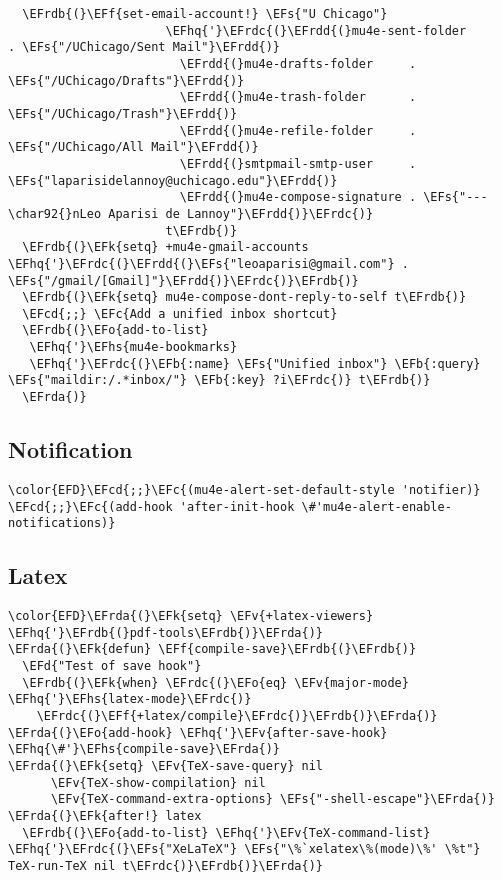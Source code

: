 \documentclass[12pt]{article}
\theoremstyle{plain}%
\theoremstyle{definition}
\theoremstyle{remark}
\newcommand{\EFc}[1]{\textcolor{EFc}{#1}} %
\newcommand{\EFcd}[1]{\textcolor{EFcd}{#1}} %
\newcommand{\EFs}[1]{\textcolor{EFs}{#1}} %
\newcommand{\EFd}[1]{\textcolor{EFd}{#1}} %
\newcommand{\EFk}[1]{\textcolor{EFk}{#1}} %
\newcommand{\EFb}[1]{\textcolor{EFb}{#1}} %
\newcommand{\EFf}[1]{\textcolor{EFf}{#1}} %
\newcommand{\EFv}[1]{\textcolor{EFv}{#1}} %
\newcommand{\EFo}[1]{\textcolor{EFo}{#1}} %
\newcommand{\EFhq}[1]{\textcolor{EFhq}{#1}} %
\newcommand{\EFhs}[1]{\textcolor{EFhs}{#1}} %
\newcommand{\EFrda}[1]{\textcolor{EFrda}{#1}} %
\newcommand{\EFrdb}[1]{\textcolor{EFrdb}{#1}} %
\newcommand{\EFrdc}[1]{\textcolor{EFrdc}{#1}} %
\newcommand{\EFrdd}[1]{\textcolor{EFrdd}{#1}} %
\begin{document}
\begin{Code}
\begin{Verbatim}
  \EFrdb{(}\EFf{set-email-account!} \EFs{"U Chicago"}
                      \EFhq{'}\EFrdc{(}\EFrdd{(}mu4e-sent-folder       . \EFs{"/UChicago/Sent Mail"}\EFrdd{)}
                        \EFrdd{(}mu4e-drafts-folder     . \EFs{"/UChicago/Drafts"}\EFrdd{)}
                        \EFrdd{(}mu4e-trash-folder      . \EFs{"/UChicago/Trash"}\EFrdd{)}
                        \EFrdd{(}mu4e-refile-folder     . \EFs{"/UChicago/All Mail"}\EFrdd{)}
                        \EFrdd{(}smtpmail-smtp-user     . \EFs{"laparisidelannoy@uchicago.edu"}\EFrdd{)}
                        \EFrdd{(}mu4e-compose-signature . \EFs{"---\char92{}nLeo Aparisi de Lannoy"}\EFrdd{)}\EFrdc{)}
                      t\EFrdb{)}
  \EFrdb{(}\EFk{setq} +mu4e-gmail-accounts \EFhq{'}\EFrdc{(}\EFrdd{(}\EFs{"leoaparisi@gmail.com"} . \EFs{"/gmail/[Gmail]"}\EFrdd{)}\EFrdc{)}\EFrdb{)}
  \EFrdb{(}\EFk{setq} mu4e-compose-dont-reply-to-self t\EFrdb{)}
  \EFcd{;;} \EFc{Add a unified inbox shortcut}
  \EFrdb{(}\EFo{add-to-list}
   \EFhq{'}\EFhs{mu4e-bookmarks}
   \EFhq{'}\EFrdc{(}\EFb{:name} \EFs{"Unified inbox"} \EFb{:query} \EFs{"maildir:/.*inbox/"} \EFb{:key} ?i\EFrdc{)} t\EFrdb{)}
  \EFrda{)}
\end{Verbatim}
\end{Code}
\subsection{Notification}
\label{sec:org967bb8a}
\begin{Code}
\begin{Verbatim}
\color{EFD}\EFcd{;;}\EFc{(mu4e-alert-set-default-style 'notifier)}
\EFcd{;;}\EFc{(add-hook 'after-init-hook \#'mu4e-alert-enable-notifications)}
\end{Verbatim}
\end{Code}
\subsection{Latex}
\label{sec:orgd3bf335}
\begin{Code}
\begin{Verbatim}
\color{EFD}\EFrda{(}\EFk{setq} \EFv{+latex-viewers} \EFhq{'}\EFrdb{(}pdf-tools\EFrdb{)}\EFrda{)}
\EFrda{(}\EFk{defun} \EFf{compile-save}\EFrdb{(}\EFrdb{)}
  \EFd{"Test of save hook"}
  \EFrdb{(}\EFk{when} \EFrdc{(}\EFo{eq} \EFv{major-mode} \EFhq{'}\EFhs{latex-mode}\EFrdc{)}
    \EFrdc{(}\EFf{+latex/compile}\EFrdc{)}\EFrdb{)}\EFrda{)}
\EFrda{(}\EFo{add-hook} \EFhq{'}\EFv{after-save-hook} \EFhq{\#'}\EFhs{compile-save}\EFrda{)}
\EFrda{(}\EFk{setq} \EFv{TeX-save-query} nil
      \EFv{TeX-show-compilation} nil
      \EFv{TeX-command-extra-options} \EFs{"-shell-escape"}\EFrda{)}
\EFrda{(}\EFk{after!} latex
  \EFrdb{(}\EFo{add-to-list} \EFhq{'}\EFv{TeX-command-list} \EFhq{'}\EFrdc{(}\EFs{"XeLaTeX"} \EFs{"\%`xelatex\%(mode)\%' \%t"} TeX-run-TeX nil t\EFrdc{)}\EFrdb{)}\EFrda{)}
\end{Verbatim}
\end{Code}
\end{document}
